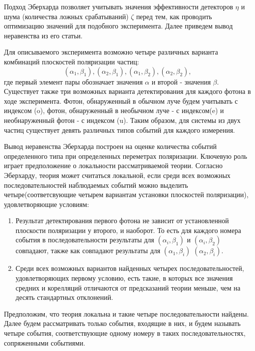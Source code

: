 \documentclass[%
master,         %
subf,           %
href,           %
colorlinks=true %
]{disser}
\numberwithin{equation}{section}
\numberwithin{figure}{section}
\begin{document}
Подход Эберхарда позволяет учитывать значения эффективности детекторов $\eta$ и шума (количества ложных срабатываний) $\zeta$ перед тем, как проводить оптимизацию значений для подобного эксперимента. Далее приведем вывод неравенства из его статьи.

Для описываемого эксперимента возможно четыре различных варианта комбинаций плоскостей поляризации частиц: 
\[
(\alpha_1, \beta_1), (\alpha_2, \beta_1), (\alpha_1, \beta_2), (\alpha_2, \beta_2),
\]
где первый элемент пары обозначает значения $\alpha$ и второй - значения $\beta$. Существует также три возможных варианта детектирования для каждого фотона в ходе эксперимента. Фотон, обнаруженный в обычном луче будем учитывать с индексом (o), фотон, обнаруженный в необычном луче - с индексом(e) и необнаруженный фотон - с индексом (u). Таким образом, для системы из двух частиц существует девять различных типов событий для каждого измерения.

Вывод неравенства Эберхарда построен на оценке количества событий определенного типа при определенных переметрах поляризации. Ключевую роль играет предположение о локальности рассматриваемой теории. Согласно Эберхарду, теория может считаться локальной, если среди всех возможных последовательностей наблюдаемых событий можно выделить четыре(соответсвующие четырем вариантам установки плоскостей поляризации), удовлетворяющие условиям:
\begin{enumerate}[label=(\roman*)]
\item Результат детектирования первого фотона не зависит от установленной плоскости поляризации у второго, и наоборот. То есть для каждого номера события в последовательности результаты для $(\alpha_i, \beta_1)$ и $(\alpha_i, \beta_2)$ совпадают, также как совпадают результаты для $(\alpha_1, \beta_i)$ $(\alpha_2, \beta_i)$.
\item Среди всех возможных вариантов найденных четырех последовательностей, удовлетворяющих первому условию, есть такие, в которых все значения средних и корелляций отличаются от предсказаний теории меньше, чем на десять стандартных отклонений.
\end{enumerate}

Предположим, что теория локальна и такие четыре последовательности найдены. Далее будем рассматривать только события, входящие в них, и будем называть четыре события, соответствующие одному номеру в таких последовательностях, сопряженными событиями. 
\end{document}
